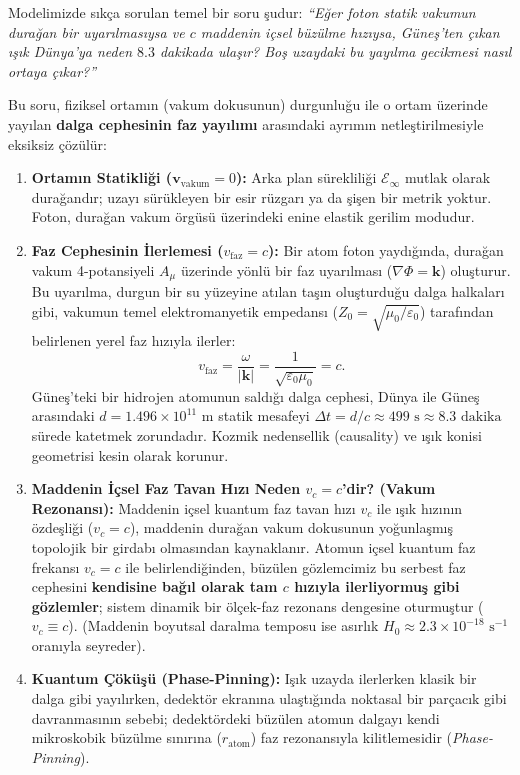 \documentclass[11pt,a4paper]{article}
\begin{document}
Modelimizde sıkça sorulan temel bir soru şudur: \textit{``Eğer foton statik vakumun durağan bir uyarılmasıysa ve $c$ maddenin içsel büzülme hızıysa, Güneş'ten çıkan ışık Dünya'ya neden $8.3$ dakikada ulaşır? Boş uzaydaki bu yayılma gecikmesi nasıl ortaya çıkar?''}

Bu soru, fiziksel ortamın (vakum dokusunun) durgunluğu ile o ortam üzerinde yayılan \textbf{dalga cephesinin faz yayılımı} arasındaki ayrımın netleştirilmesiyle eksiksiz çözülür:

\begin{enumerate}
    \item \textbf{Ortamın Statikliği ($\mathbf{v}_{\mathrm{vakum}} = 0$):} Arka plan sürekliliği $\mathcal{E}_\infty$ mutlak olarak durağandır; uzayı sürükleyen bir esir rüzgarı ya da şişen bir metrik yoktur. Foton, durağan vakum örgüsü üzerindeki enine elastik gerilim modudur.
    \item \textbf{Faz Cephesinin İlerlemesi ($v_{\mathrm{faz}} = c$):} Bir atom foton yaydığında, durağan vakum 4-potansiyeli $A_\mu$ üzerinde yönlü bir faz uyarılması ($\nabla \Phi = \mathbf{k}$) oluşturur. Bu uyarılma, durgun bir su yüzeyine atılan taşın oluşturduğu dalga halkaları gibi, vakumun temel elektromanyetik empedansı ($Z_0 = \sqrt{\mu_0/\varepsilon_0}$) tarafından belirlenen yerel faz hızıyla ilerler:
          \begin{equation}
              v_{\mathrm{faz}} = \frac{\omega}{|\mathbf{k}|} = \frac{1}{\sqrt{\varepsilon_0 \mu_0}} = c.
              \label{eq:faz_hizi_ispat}
          \end{equation}
          Güneş'teki bir hidrojen atomunun saldığı dalga cephesi, Dünya ile Güneş arasındaki $d = 1.496 \times 10^{11}\text{ m}$ statik mesafeyi $\Delta t = d/c \approx 499\text{ s} \approx 8.3\text{ dakika}$ sürede katetmek zorundadır. Kozmik nedensellik (causality) ve ışık konisi geometrisi kesin olarak korunur.
    \item \textbf{Maddenin İçsel Faz Tavan Hızı Neden $v_c = c$'dir? (Vakum Rezonansı):} Maddenin içsel kuantum faz tavan hızı $v_c$ ile ışık hızının özdeşliği ($v_c = c$), maddenin durağan vakum dokusunun yoğunlaşmış topolojik bir girdabı olmasından kaynaklanır. Atomun içsel kuantum faz frekansı $v_c = c$ ile belirlendiğinden, büzülen gözlemcimiz bu serbest faz cephesini \textbf{kendisine bağıl olarak tam $c$ hızıyla ilerliyormuş gibi gözlemler}; sistem dinamik bir ölçek-faz rezonans dengesine oturmuştur ($v_c \equiv c$). (Maddenin boyutsal daralma temposu ise asırlık $H_0 \approx 2.3 \times 10^{-18}\text{ s}^{-1}$ oranıyla seyreder).
    \item \textbf{Kuantum Çöküşü (Phase-Pinning):} Işık uzayda ilerlerken klasik bir dalga gibi yayılırken, dedektör ekranına ulaştığında noktasal bir parçacık gibi davranmasının sebebi; dedektördeki büzülen atomun dalgayı kendi mikroskobik büzülme sınırına ($r_{\mathrm{atom}}$) faz rezonansıyla kilitlemesidir (\textit{Phase-Pinning}).
\end{enumerate}
\end{document}
